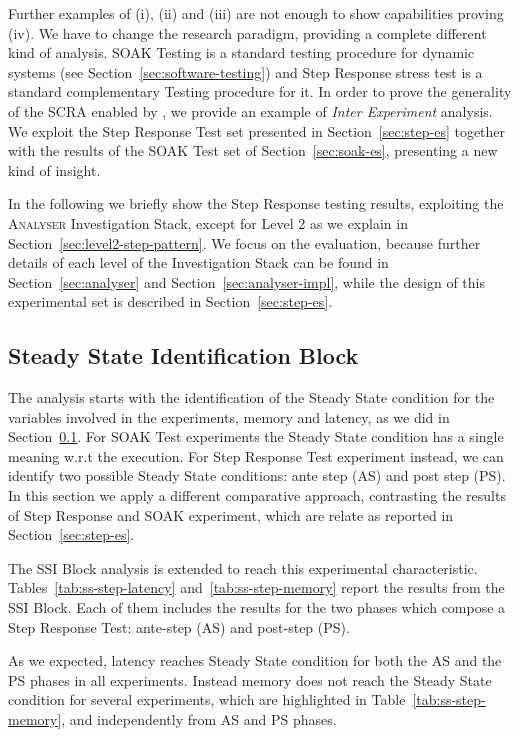 Further examples of (i), (ii) and (iii) are not enough to show \name capabilities proving (iv). We have to change the research paradigm, providing a complete different kind of analysis. SOAK Testing is a standard testing procedure for dynamic systems (see Section~\ref{sec:software-testing}) and Step Response stress test is a standard complementary Testing procedure for it. In order to prove the generality of the SCRA enabled by \namens, we provide an example of \textit{Inter Experiment} analysis. We exploit the Step Response Test set presented in Section~\ref{sec:step-es} together with the results of the SOAK Test set of Section~\ref{sec:soak-es}, presenting a new kind of insight.

In the following we briefly show the Step Response testing results, exploiting the \textsc{Analyser} Investigation Stack, except for Level 2 as we explain in Section~\ref{sec:level2-step-pattern}. We focus on the evaluation, because further details of each level of the Investigation Stack can be found in Section~\ref{sec:analyser} and Section~\ref{sec:analyser-impl}, while the design of this experimental set is described in Section~\ref{sec:step-es}.

\subsection{Steady State Identification Block}\label{sec:level0-step-ssib}

The analysis starts with the identification of the Steady State condition for the variables involved in the experiments, memory and latency, as we did in Section~\ref{sec:level0-step-ssib}. For SOAK Test experiments the Steady State condition has a single meaning w.r.t the execution. For Step Response Test experiment instead, we can identify two possible Steady State conditions: ante step (AS) and post step (PS). In this section we apply a different comparative approach, contrasting the results of Step Response and SOAK experiment, which are relate as reported in Section~\ref{sec:step-es}. 

The SSI Block analysis is extended to reach this experimental characteristic. Tables~\ref{tab:ss-step-latency} and~\ref{tab:ss-step-memory} report the results from the SSI Block. Each of them includes the results for the two phases which compose a Step Response Test: ante-step (AS) and post-step (PS). 

As we expected, latency reaches Steady State condition for both the AS and the PS phases in all experiments. Instead memory does not reach the Steady State condition for several experiments,  which are highlighted in Table~\ref{tab:ss-step-memory}, and independently from AS and PS phases.

